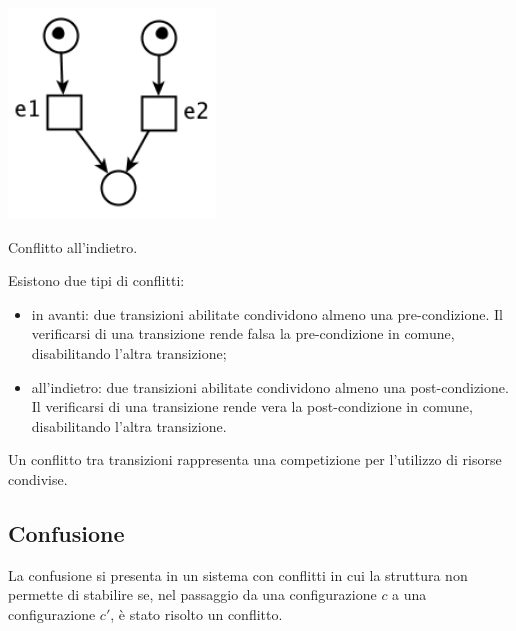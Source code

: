 \begin{defn}
    \begin{marginfigure}
        \includegraphics[width=0.75\linewidth]{img/conflitto_indietro.png}
        \caption{Conflitto all'indietro.}
        \label{fig:conflitto_indietro}
    \end{marginfigure}

    Esistono due tipi di conflitti:
    \begin{itemize}
        \item in avanti: due transizioni abilitate condividono almeno una
        pre-condizione.
        Il verificarsi di una transizione rende falsa la pre-condizione in comune,
        disabilitando l'altra transizione;
        \item all'indietro: due transizioni abilitate condividono almeno una
        post-condizione. Il verificarsi di una transizione rende vera la
        post-condizione in comune, disabilitando l'altra transizione.
    \end{itemize}

    \begin{rem}
        Un conflitto tra transizioni rappresenta una competizione
        per l'utilizzo di risorse condivise.
    \end{rem}
\end{defn}

\subsection*{Confusione}
La confusione si presenta in un sistema con conflitti in cui la struttura non
permette di stabilire se, nel passaggio da una configurazione $c$ a una
configurazione $c'$, è stato risolto un conflitto.

